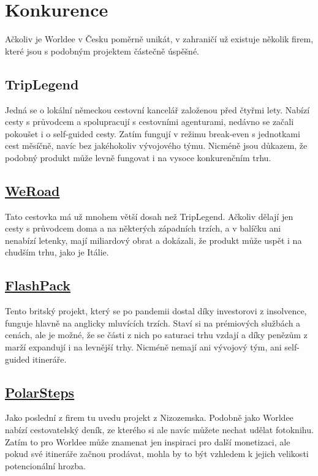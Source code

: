 \section{Konkurence}

Ačkoliv je Worldee v Česku poměrně unikát, v zahraničí už existuje několik firem, které jsou s podobným projektem částečně úspěšné.

\subsection*{TripLegend} 
Jedná se o lokální německou cestovní kancelář založenou před čtyřmi lety. Nabízí cesty s průvodcem a spolupracují s cestovními agenturami, nedávno se začali pokoušet i o self-guided cesty. Zatím fungují v režimu break-even s jednotkami cest měsíčně, navíc bez jakéhokoliv vývojového týmu. Nicméně jsou důkazem, že podobný produkt může levně fungovat i na vysoce konkurenčním trhu.

\subsection*{\href{https://www.weroad.com/}{WeRoad}}
Tato cestovka má už mnohem větší dosah než TripLegend. Ačkoliv dělají jen cesty s průvodcem doma a na některých západních trzích, a v balíčku ani nenabízí letenky, mají miliardový obrat a dokázali, že produkt může uspět i na chudším trhu, jako je Itálie.

\subsection*{\href{https://www.flashpack.com/}{FlashPack}}
Tento britský projekt, který se po pandemii dostal díky investorovi z insolvence, funguje hlavně na anglicky mluvících trzích. Staví si na prémiových službách a cenách, ale je možné, že se části z nich po saturaci trhu vzdají a díky penězům z marží expandují i na levnější trhy. Nicméně nemají ani vývojový tým, ani self-guided itineráře.

\subsection*{\href{https://www.polarsteps.com/}{PolarSteps}}
Jako poslední z firem tu uvedu projekt z Nizozemska. Podobně jako Worldee nabízí cestovatelský deník, ze kterého si ale navíc můžete nechat udělat fotoknihu. Zatím to pro Worldee může znamenat jen inspiraci pro další monetizaci, ale pokud své itineráře začnou prodávat, mohla by to být vzhledem k jejich velikosti potencionální hrozba.